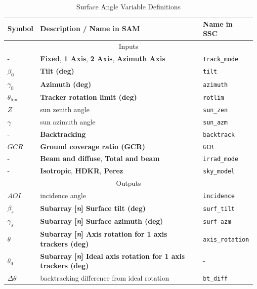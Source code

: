 \documentclass[12pt,letterpaper]{article}
\newcommand\GCR{\ensuremath{\mathit{GCR}}}
\newcommand\AOI{\ensuremath{\mathit{AOI}}}
\begin{document}
\begin{table}
\begin{center}
\caption{Surface Angle Variable Definitions}
\begin{tabular}{lll}
\midrule
Symbol & Description / \textbf{Name in SAM} & Name in SSC\\
\midrule
\multicolumn{3}{c}{Inputs}\\
- & \textbf{Fixed}, \textbf{1 Axis}, \textbf{2 Axis}, \textbf{Azimuth Axis} & \texttt{track\_mode}\\
$\beta_0$ & \textbf{Tilt (deg)}& \texttt{tilt}\\
$\gamma_0$ & \textbf{Azimuth (deg)} & \texttt{azimuth}\\
$\theta_{\mathrm{lim}}$ & \textbf{Tracker rotation limit (deg)} & \texttt{rotlim}\\
$Z$ & sun zenith angle & \texttt{sun\_zen}\\
$\gamma$ & sun azimuth angle & \texttt{sun\_azm}\\
- & \textbf{Backtracking }& \texttt{backtrack}\\
$\GCR$ & \textbf{Ground coverage ratio (GCR)} & \texttt{GCR}\\
- & \textbf{Beam and diffuse}, \textbf{Total and beam} & \texttt{irrad\_mode}\\
- & \textbf{Isotropic}, \textbf{HDKR}, \textbf{Perez} & \texttt{sky\_model}\\
\midrule
\multicolumn{3}{c}{Outputs}\\
$\AOI$ & incidence angle & \texttt{incidence}\\
$\beta_s$ & \textbf{Subarray [\textit{n}] Surface tilt (deg)} & \texttt{surf\_tilt}\\
$\gamma_s$ & \textbf{Subarray [\textit{n}] Surface azimuth (deg)} & \texttt{surf\_azm}\\
$\theta$ & \textbf{Subarray [\textit{n}] Axis rotation for 1 axis trackers (deg)} & \texttt{axis\_rotation}\\
$\theta_0$ & \textbf{Subarray [\textit{n}] Ideal axis rotation for 1 axis trackers (deg)} & -\\
$\Delta\theta$ & backtracking difference from ideal rotation & \texttt{bt\_diff}\\
\midrule
\end{tabular}
\label{tab-surfaceanglevars}
\end{center}
\end{table}
\end{document}

